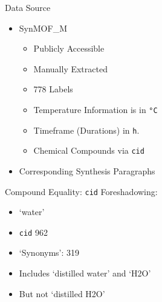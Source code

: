 \begin{frame}[c]{Data Source}
    \Large
    \begin{itemize}[<+(1)->]
        \item SynMOF\_M \cite{luo_mof_2022}
            \begin{itemize}[<+(1)->]
                \large
                \item Publicly Accessible
                \item Manually Extracted
                \item 778 Labels
                \item Temperature Information is in \texttt{°C}
                \item Timeframe (Durations) in \texttt{h}.
                \item Chemical Compounds via \texttt{cid}
            \end{itemize}
        \item Corresponding Synthesis Paragraphs 
    \end{itemize}
\end{frame}



\begin{frame}[c]{Compound Equality: \texttt{cid}}
    \large
    Foreshadowing:
    \begin{itemize}[<+(1)->]
        \item `water'
        \item \texttt{cid} 962
        \item `Synonyms': 319
        \item Includes `distilled water' and `H2O'
        \item But not `distilled H2O' 
    \end{itemize}
\end{frame}
